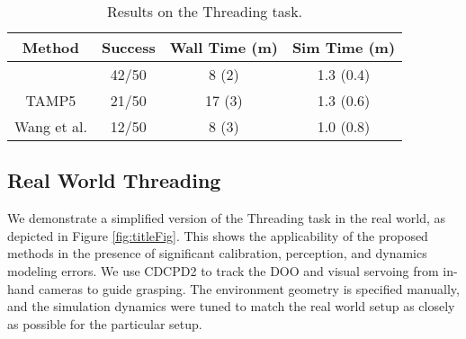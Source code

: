 \begin{table}
    \centering
    \begin{tabular}{cccc}
        Method & Success & Wall Time (m) & Sim Time (m) \\ \hline
        \signature{} & 42/50 & 8 (2) & 1.3 (0.4) \\
        TAMP5 & 21/50 & 17 (3) & 1.3 (0.6) \\
        Wang et al. \cite{Weifu} & 12/50 & 8 (3) & 1.0 (0.8) \\
    \end{tabular}
    \caption{Results on the Threading task.}
    \label{tab:threading}
\end{table}


\subsection{Real World Threading}

We demonstrate a simplified version of the Threading task in the real world, as depicted in Figure \ref{fig:titleFig}. This shows the applicability of the proposed methods in the presence of significant calibration, perception, and dynamics modeling errors. We use CDCPD2 \cite{CDCPD2} to track the DOO and visual servoing from in-hand cameras to guide grasping. The environment geometry is specified manually, and the simulation dynamics were tuned to match the real world setup as closely as possible for the particular setup.